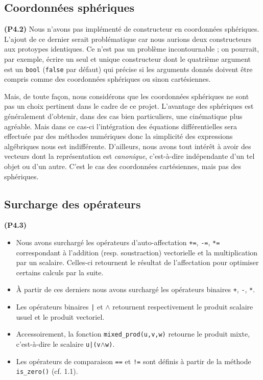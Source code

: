 \documentclass[12pt, letterpaper, twoside]{article}
\newcommand{\T}[1]{\texttt{#1}}
\begin{document}
\subsection{Coordonnées sphériques}
\noindent \textbf{(P4.2)} Nous n’avons pas implémenté de constructeur en coordonnées sphériques. L’ajout de ce dernier serait problématique car nous aurions deux constructeurs aux protoypes identiques.  Ce n'est pas un problème incontournable ; on pourrait, par exemple, écrire un seul et unique constructeur dont le quatrième argument est un \T{bool} (\T{false} par défaut) qui précise si les arguments donnés doivent être compris comme des coordonnées sphériques ou sinon cartésiennes.

Mais, de toute façon, nous considérons que les coordonnées sphériques ne sont pas un choix pertinent dans le cadre de ce projet. L'avantage des sphériques est généralement d'obtenir, dans des cas bien particuliers, une cinématique plus agréable. Mais dans ce cas-ci l'intégration des équations différentielles sera effectuée par des méthodes numériques donc la simplicité des expressions algébriques nous est indifférente. D'ailleurs, nous avons tout intérêt à avoir des vecteurs dont la représentation est \textit{canonique}, c'est-à-dire indépendante d'un tel objet ou d'un autre. C'est le cas des coordonnées cartésiennes, mais pas des sphériques.

\subsection{Surcharge des opérateurs}
\noindent \textbf{(P4.3)}
\begin{itemize}
\item Nous avons surchargé les opérateurs d'auto-affectation \T{+=}, \T{-=}, \T{*=} correspondant à l'addition (resp. soustraction) vectorielle et la multiplication par un scalaire. Celles-ci retournent le résultat de l'affectation pour optimiser certains calculs par la suite.

\item À partir de ces derniers nous avons surchargé les opérateurs binaires \T{+}, \T{-}, \T{*}.

\item Les opérateurs binaires \T{|} et \T{$\wedge$} retournent respectivement le produit scalaire usuel et le produit vectoriel.

\item Accessoirement, la fonction \T{mixed\_prod(u,v,w)} retourne le produit mixte, c'est-à-dire le scalaire \T{u|(v$\wedge$w)}.

\item Les opérateurs de comparaison \T{==} et \T{!=} sont définis à partir de la méthode \T{is\_zero()} (cf. 1.1).
\end{itemize}
\end{document}
